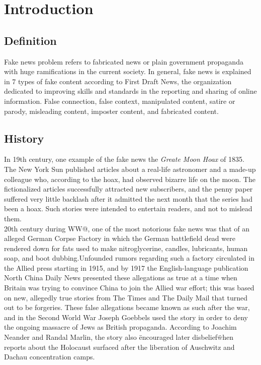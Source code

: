 \documentclass[twoside,twocolumn]{article}
\makeatletter
\newcommand*{\rom}[1]{\expandafter\@slowromancap\romannumeral #1@}
\makeatother
\begin{document}
    \linespread{1.05} %
    \section{Introduction}

    \subsection{Definition}
    Fake news problem refers to fabricated news or plain 
    government propaganda with huge ramifications in the current society. In general, 
    fake news is explained in 7 types of fake content according to First Draft News, 
    the organization dedicated to improving skills and standards in the reporting and 
    sharing of online information. False connection, false context, manipulated content,
    satire or parody, misleading content, imposter content, and fabricated content.

    \subsection{History}
    In 19th century, one example of the fake news the 
    \emph{Greate Moon Hoax} of 1835. The New York Sun published articles about a real-life 
    astronomer and a made-up colleague who, according to the hoax, had observed bizarre 
    life on the moon. The fictionalized articles successfully attracted new subscribers, 
    and the penny paper suffered very little backlash after it admitted the next month 
    that the series had been a hoax. Such stories were intended to entertain readers, and 
    not to mislead them. \\20th century during WW\rom{1}, one of the most notorious fake news
    was that of an alleged German Corpse Factory in which the German battlefield dead were 
    rendered down for fats used to make nitroglycerine, candles, lubricants, human soap, and
    boot dubbing.Unfounded rumors regarding such a factory circulated in the Allied press 
    starting in 1915, and by 1917 the English-language publication North China Daily News 
    presented these allegations as true at a time when Britain was trying to convince China 
    to join the Allied war effort; this was based on new, allegedly true stories from The 
    Times and The Daily Mail that turned out to be forgeries. These false allegations became 
    known as such after the war, and in the Second World War Joseph Goebbels used the story 
    in order to deny the ongoing massacre of Jews as British propaganda. According to Joachim
     Neander and Randal Marlin, the story also \"encouraged later disbelief\" when reports 
     about the Holocaust surfaced after the liberation of Auschwitz and Dachau concentration 
     camps.
\end{document}
